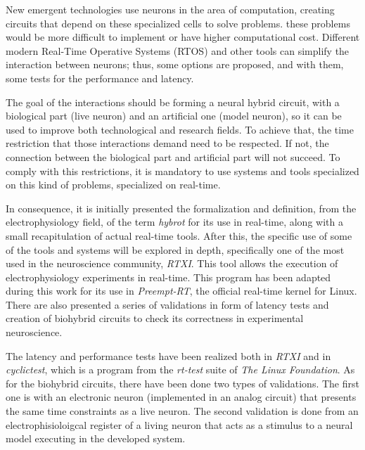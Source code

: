 

New emergent technologies use neurons in the area of computation, creating circuits that depend on these specialized cells to solve problems. these problems would be more difficult to implement or have higher computational cost. Different modern Real-Time Operative Systems (RTOS) and other tools can simplify the interaction between neurons; thus, some options are proposed, and with them, some tests for the performance and latency. 

The goal of the interactions should be forming a neural hybrid circuit, with a biological part (live neuron) and an artificial one (model neuron), so it can be used to improve both technological and research fields. To achieve that, the time restriction that those interactions demand need to be respected. If not, the connection between the biological part and artificial part will not succeed. To comply with this restrictions, it is mandatory to use systems and tools specialized on this kind of problems, specialized on real-time.

In consequence, it is initially presented the formalization and definition, from the electrophysiology field, of the term \textit{hybrot} for its use in real-time, along with a small recapitulation of actual real-time tools. After this, the specific use of some of the tools and systems will be explored in depth, specifically one of the most used in the neuroscience community, \textit{RTXI}. This tool allows the execution of electrophysiology experiments in real-time. This program has been adapted during this work for its use in \textit{Preempt-RT}, the official real-time kernel for Linux. There are also presented a series of validations in form of latency tests and creation of biohybrid circuits to check its correctness in experimental neuroscience. 

The latency and performance tests have been realized both in \textit{RTXI} and in \textit{cyclictest}, which is a program from the \textit{rt-test} suite of \textit{The Linux Foundation}. As for the biohybrid circuits, there have been done two types of validations. The first one is with an electronic neuron (implemented in an analog circuit) that presents the same time constraints as a live neuron. The second validation is done from an electrophisioloigcal register of a living neuron that acts as a stimulus to a neural model executing in the developed system.